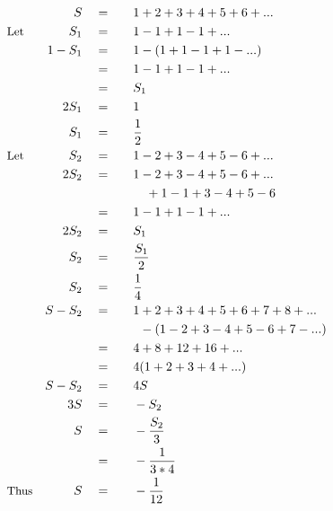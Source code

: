 \begin{alignat*}{5}
&\,&S\quad&=\quad&&1+2+3+4+5+6+...\\
&\small\text{Let}&S_1\quad&=&&1-1+1-1+...\\
&\,&1-S_1\quad&=&&1-(1+1-1+1-...)\\
&\,&\,&=&&1-1+1-1+...\\
&\,&\,&=&& S_1\\
&\,&2S_1\quad&=&&1\\
&\,&S_1\quad&=&&\frac{1}{2}\\
&\small\text{Let}&S_2\quad&=&&1-2+3-4+5-6+...\\
&\,&2S_2\quad&=&&1-2+3-4+5-6+...\\
&\,&\,&\,&&\quad+1-1+3-4+5-6\\
&\,&\,&=&&1-1+1-1+...\\
&\,&2S_2\quad&=&& S_1\\
&\,&S_2\quad&=&&\frac{S_1}{2}\\
&\,&S_2\quad&=&&\frac{1}{4}\\
&\,&S-S_2\quad&=&&1+2+3+4+5+6+7+8+...\\
&\,&\,&\,&&\,\,\,-(1-2+3-4+5-6+7-...)\\
&\,&\,&=&&4+8+12+16+...\\
&\,&\,&=&&4(1+2+3+4+...)\\
&\,&S-S_2\quad&=&&4S\\
&\,&3S\quad&=&&-S_2\\
&\,&S\quad&=&&-\frac{S_2}{3}\\
&\,&\,&=&&-\frac{1}{3*4}\\
&\small\text{Thus}&S\quad&=&&-\frac{1}{12}
\end{alignat*}
